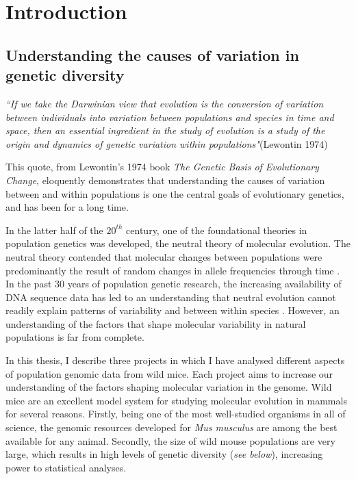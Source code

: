 \chapter{Introduction}

\section{Understanding the causes of variation in genetic diversity}

	\textit{``If we take the Darwinian view that evolution is the conversion of variation between individuals into variation between populations and species in time and space, then an essential ingredient in the study of evolution is a study of the origin and dynamics of genetic variation within populations"}(Lewontin 1974)

\noindent
This quote, from Lewontin's 1974 book \textit{The Genetic Basis of Evolutionary Change}, eloquently demonstrates that understanding the causes of variation between and within populations is one the central goals of evolutionary genetics, and has been for a long time.
	
	 In the latter half of the $20^{th}$ century, one of the foundational theories in population genetics was developed, the neutral theory of molecular evolution. The neutral theory contended that molecular changes between populations were predominantly the result of random changes in allele frequencies through time \citep{RN175}. In the past 30 years of population genetic research, the increasing availability of DNA sequence data has led to an understanding that neutral evolution cannot readily explain patterns of variability and between within species \citep{RN358}. However, an understanding of the factors that shape molecular variability in natural populations is far from complete.

	In this thesis, I describe three projects in which I have analysed different aspects of population genomic data from wild mice. Each project aims to increase our understanding of the factors shaping molecular variation in the genome. Wild mice are an excellent model system for studying molecular evolution in mammals for several reasons. Firstly, being one of the most well-studied organisms in all of science, the genomic resources developed for \textit{Mus musculus} are among the best available for any animal. Secondly, the size of wild mouse populations are very large, which results in high levels of genetic diversity (\textit{see below}), increasing power to statistical analyses. 

